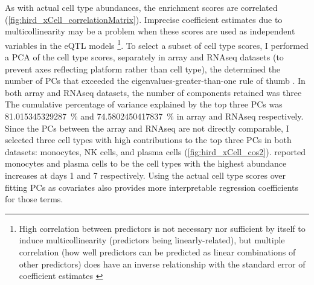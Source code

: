 As with actual cell type abundances, the enrichment scores are correlated (\cref{fig:hird_xCell_correlationMatrix}).
Imprecise coefficient estimates due to multicollinearity may be a problem when these scores are used as independent variables in the \gls{eQTL} models%
\footnote{
    High correlation between predictors is not necessary nor sufficient by itself to induce multicollinearity (predictors being linearly-related), but multiple correlation (how well predictors can be predicted as linear combinations of other predictors) does have an inverse relationship with the standard error of coefficient estimates \autocite{maddala1992IntroductionEconometrics}
}.
To select a subset of cell type scores, I performed a \gls{PCA} of the cell type scores,
separately in array and \gls{RNAseq} datasets (to prevent axes reflecting platform rather than cell type),
the determined the number of \glspl{PC} that exceeded the eigenvalues-greater-than-one rule of thumb \autocite{kanyongo2005InfluenceReliabilityFour}.
In both array and \gls{RNAseq} datasets, the number of components retained was three
The cumulative percentage of variance explained by the top three \glspl{PC} was \SI{81.015345329287}{\percent} and \SI{74.5802450417837}{\percent} in array and \gls{RNAseq} respectively.
Since the \glspl{PC} between the array and \gls{RNAseq} are not directly comparable,
I selected three cell types with high contributions to the top three \glspl{PC} in both datasets:
monocytes, \gls{NK} cells, and plasma cells (\cref{fig:hird_xCell_cos2}).
\textcite{sobolev2016AdjuvantedInfluenzaH1N1Vaccination} reported monocytes and plasma cells to be the cell types with the highest abundance increases at days 1 and 7 respectively.
Using the actual cell type scores over fitting \glspl{PC} as covariates also provides more interpretable regression coefficients for those terms.

